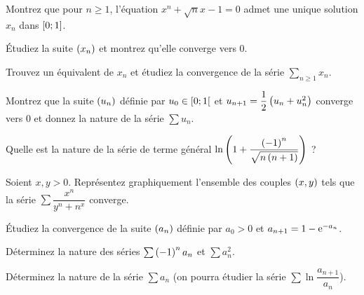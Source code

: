 \begin{corr}
\end{corr}

\begin{exo}
Montrez que pour \(n\geq1\), l'équation \(x^n+\sqrt{n}x-1=0\) admet une unique solution \(x_n\) dans \(\left[0;1\right]\).

Étudiez la suite \(\left(x_n\right)\) et montrez qu'elle converge vers \(0\).

Trouvez un équivalent de \(x_n\) et étudiez la convergence de la série \(\sum_{n\geq1}x_n\).
\end{exo}

\begin{corr}
\end{corr}

\begin{exo}
Montrez que la suite \(\left(u_n\right)\) définie par \(u_0\in\left[0;1\right[\) et \(u_{n+1}=\dfrac{1}{2}\left(u_n+u_n^2\right)\) converge vers \(0\) et donnez la nature de la série \(\sum u_n\).
\end{exo}

\begin{corr}
\end{corr}

\begin{exo}
Quelle est la nature de la série de terme général \(\ln\left(1+\dfrac{\left(-1\right)^n}{\sqrt{n\left(n+1\right)}}\right)\) ?
\end{exo}

\begin{corr}
\end{corr}

\begin{exo}
Soient \(x,y>0\). Représentez graphiquement l'ensemble des couples \(\left(x,y\right)\) tels que la série \(\sum\dfrac{x^n}{y^n+n^x}\) converge.
\end{exo}

\begin{corr}
\end{corr}

\begin{exo}
Étudiez la convergence de la suite \(\left(a_n\right)\) définie par \(a_0>0\) et \(a_{n+1}=1-\mathrm{e}^{-a_n}\).

Déterminez la nature des séries \(\sum\left(-1\right)^na_n\) et \(\sum a_n^2\).

Déterminez la nature de la série \(\sum a_n\) (on pourra étudier la série \(\sum\ln\dfrac{a_{n+1}}{a_n}\)).
\end{exo}

